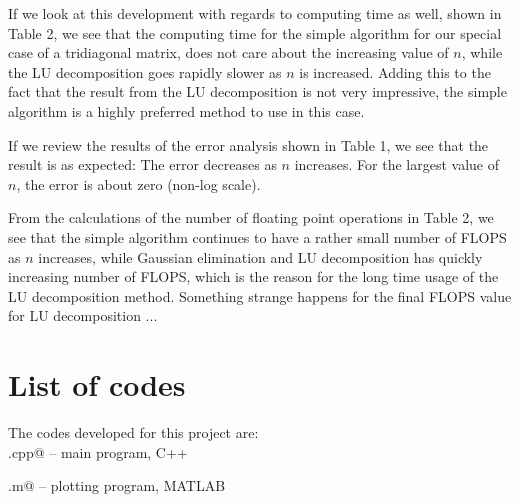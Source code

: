\documentclass{article}
\begin{document}
\begin{multicols}{2}
If we look at this development with regards to computing time as well, shown in Table 2, we see that the computing time for the simple algorithm for our special case of a tridiagonal matrix, does not care about the increasing value of $n$, while the LU decomposition goes rapidly slower as $n$ is increased. Adding this to the fact that the result from the LU decomposition is not very impressive, the simple algorithm is a highly preferred method to use in this case.

If we review the results of the error analysis shown in Table 1, we see that the result is as expected: The error decreases as $n$ increases. For the largest value of $n$, the error is about zero (non-log scale).

From the calculations of the number of floating point operations in Table 2, we see that the simple algorithm continues to have a rather small number of FLOPS as $n$ increases, while Gaussian elimination and LU decomposition has quickly increasing number of FLOPS, which is the reason for the long time usage of the LU decomposition method. Something strange happens for the final FLOPS value for LU decomposition ...


\section{List of codes}

The codes developed for this project are:\\

\noindent \verb@main.cpp@ -- main program, C++

\noindent \verb@plotting.m@ -- plotting program, MATLAB
\end{multicols}
\end{document}

